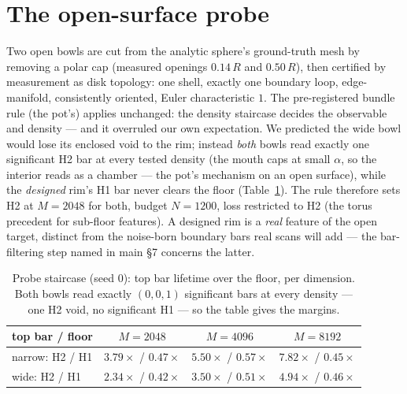\section{The open-surface probe}
\label{app:probe}


Two open bowls are cut from the analytic sphere's ground-truth mesh by
removing a polar cap (measured openings $0.14\,R$ and $0.50\,R$), then
certified by measurement as disk topology: one shell, exactly one
boundary loop, edge-manifold, consistently oriented, Euler
characteristic $1$. The pre-registered bundle rule (the pot's) applies
unchanged: the density staircase decides the observable and density ---
and it overruled our own expectation. We predicted the wide bowl would
lose its enclosed void to the rim; instead \emph{both} bowls read
exactly one significant H2 bar at every tested density (the mouth caps
at small $\alpha$, so the interior reads as a chamber --- the pot's
mechanism on an open surface), while the \emph{designed} rim's H1 bar
never clears the floor (Table~\ref{tab:probestair}). The rule therefore
sets H2 at $M{=}2048$ for both, budget $N{=}1200$, loss restricted to
H2 (the torus precedent for sub-floor features). A designed rim is a
\emph{real} feature of the open target, distinct from the noise-born
boundary bars real scans will add --- the bar-filtering step named in
main \S7 concerns the latter.

\begin{table}[t]
\centering
\caption{Probe staircase (seed 0): top bar lifetime over the floor, per
dimension. Both bowls read exactly $(0,0,1)$ significant bars at every
density --- one H2 void, no significant H1 --- so the table gives the
margins.}
\label{tab:probestair}
\scriptsize
\setlength{\tabcolsep}{3pt}
\begin{tabular}{lccc}
\toprule
top bar / floor & $M{=}2048$ & $M{=}4096$ & $M{=}8192$ \\
\midrule
narrow: H2 / H1 & $3.79\times$ / $0.47\times$ & $5.50\times$ / $0.57\times$ & $7.82\times$ / $0.45\times$ \\
wide: H2 / H1   & $2.34\times$ / $0.42\times$ & $3.50\times$ / $0.51\times$ & $4.94\times$ / $0.46\times$ \\
\bottomrule
\end{tabular}
\end{table}

